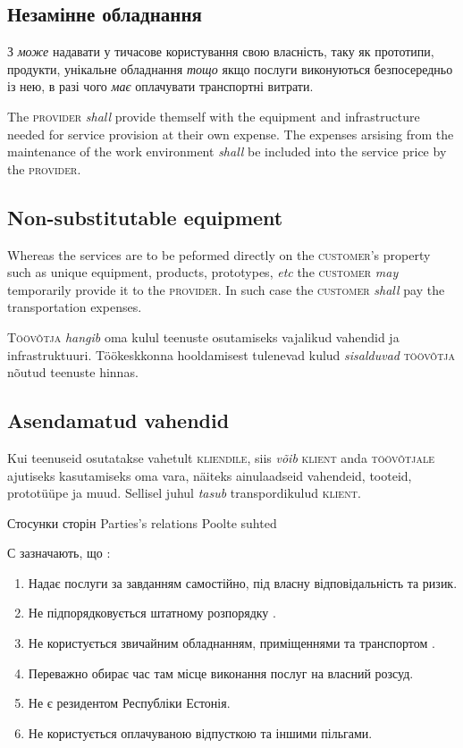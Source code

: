 \begin{Form}
\begin{paracol}{3}
{        \subsection{Незамінне обладнання}
        З \textit{може} надавати  у тичасове користування свою власність, таку як прототипи, продукти, унікальне обладнання \textit{тощо} якщо послуги виконуються безпосередньо із нею, в разі чого  \textit{має} оплачувати транспортні витрати.}
        {The \textsc{provider} \textit{shall} provide themself with the equipment and infrastructure needed for service provision at their own expense. The expenses arsising from the maintenance of the work environment \textit{shall} be included into the service price by the \textsc{provider}. 

        \subsection{Non-substitutable equipment}
        Whereas the services are to be peformed directly on the \textsc{customer}'s property such as unique equipment, products, prototypes, \textit{etc} the \textsc{customer} \textit{may} temporarily provide it to the \textsc{provider}. In such case the \textsc{customer} \textit{shall} pay the transportation expenses.}
        {T\textsc{öövõtja} \emph{hangib} oma kulul teenuste osutamiseks vajalikud vahendid ja infrastruktuuri. Töökeskkonna hooldamisest tulenevad kulud \emph{sisalduvad} \textsc{töövõtja} nõutud teenuste hinnas.

        \subsection{Asendamatud vahendid}
        Kui teenuseid osutatakse vahetult \textsc{kliendile}, siis \emph{võib} \textsc{klient} anda \textsc{töövõtjale} ajutiseks kasutamiseks oma vara, näiteks ainulaadseid vahendeid, tooteid, prototüüpe ja muud. Sellisel juhul \emph{tasub} transpordikulud \textsc{klient}.
        }
      \multibreak
      \clause
        {Стосунки сторін}
        {Parties's relations}
        {Poolte suhted}
        {С зазначають, що :
        \begin{enumerate}
          \item Надає послуги за завданням самостійно, під власну відповідальність та ризик.
          \item Не підпорядковується штатному розпорядку .
          \item Не користується звичайним обладнанням, приміщеннями та транспортом .
          \item Переважно обирає час там місце виконання послуг на власний розсуд.
          \item Не є резидентом Республіки Естонія.
          \item Не користується оплачуваною відпусткою та іншими пільгами.
        \end{enumerate}

}
\end{paracol}
\end{Form}
